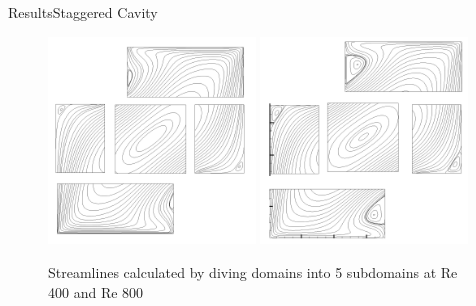 \documentclass[11pt]{beamer}
\begin{document}
\begin{frame}{Results}{Staggered Cavity}
\begin{figure}[Hh]
\includegraphics[width=0.49\textwidth]{images/stagerred/400block}
\includegraphics[width=0.49\textwidth]{images/stagerred/800block}
\caption{Streamlines calculated by diving domains into 5 subdomains at Re 400 and Re 800}
\end{figure}
\end{frame}
\end{document}
